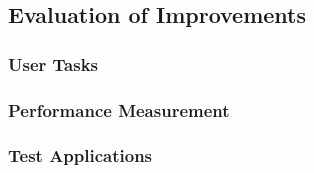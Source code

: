 \subsection{Evaluation of Improvements}
	\subsubsection{User Tasks}

	\subsubsection{Performance Measurement}
	\subsubsection{Test Applications}
